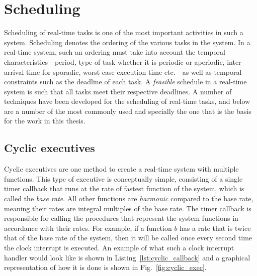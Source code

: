 \section{Scheduling}
\label{sec:scheduling}
Scheduling of real-time tasks is one of the most important activities
in such a system. Scheduling denotes the ordering of the various tasks
in the system. In a real-time system, such an ordering must take into
account the temporal characteristics---period, type of task whether it
is periodic or aperiodic, inter-arrival time for sporadic, worst-case
execution time etc.---as well as temporal constraints such as the
deadline of each task. A \emph{feasible} schedule in a real-time
system is such that all tasks meet their respective deadlines. A
number of techniques have been developed for the scheduling of
real-time tasks, and below are a number of the most commonly used and
specially the one that is the basis for the work in this thesis.

\subsection{Cyclic executives}
Cyclic executives are one method to create a real-time system with
multiple functions. This type of executive is conceptually
simple, consisting of a single timer callback that runs at the rate of
fastest function of the system, which is called the \emph{base
  rate}. All other functions are \emph{harmonic} compared to the
base rate, meaning their rates are integral multiples of the base
rate. The timer callback is responsible for calling the procedures
that represent the system functions in accordance with
their rates. For example, if a function $b$ has a rate that is twice
that of the base rate of the system, then it will be called once every
second time the clock interrupt is executed. An example of what such a
clock interrupt handler would look like is shown in
Listing~\ref{lst:cyclic_callback} and a graphical representation of
how it is done is shown in Fig.~\ref{fig:cyclic_exec}.

